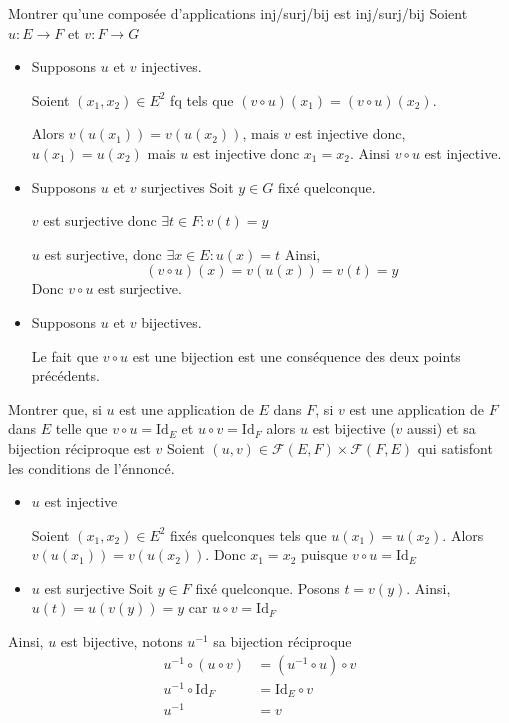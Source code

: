 \documentclass{article}
\renewenvironment{question_kholle}[2][ ]
{
	\subsection{\texorpdfstring{#2}{}}
	\notblank{#1}
	{
		\noindent #1
		\bigbreak
	}
	{}
	\begin{proof}
}
{
	\end{proof}
}
\begin{document}
\begin{question_kholle}{Montrer qu'une composée d'applications inj/surj/bij est inj/surj/bij}
	Soient $u : E \to F$ et $v: F \to G$
	\begin{itemize}[label = $\lozenge$]
		\item Supposons $u$ et $v$ injectives.

		      Soient $(x_{1}, x_{2}) \in E^{2}$ fq tels que $(v \circ u) (x_{1}) =(v\circ u)(x_{2})$.

		      Alors $v(u(x_{1})) = v(u(x_{2}))$, mais $v$ est injective donc, $u(x_{1})= u(x_{2})$ mais $u$ est injective donc $x_{1} = x_{2}$.
		      Ainsi $v \circ u$ est injective.
		\item Supposons $u$ et $v$ surjectives
		      Soit $y \in G$ fixé quelconque.

		      $v$ est surjective donc $\exists t \in F : v(t) = y$

		      $u$ est surjective, donc $\exists x \in E : u(x) = t$
		      Ainsi,
		      $$
			      (v \circ u) (x) = v(u(x)) = v(t) = y
		      $$
		      Donc $v \circ u$ est surjective.

		\item Supposons $u$ et $v$ bijectives.

		      Le fait que $v \circ u$ est une bijection est une conséquence des deux points précédents.

	\end{itemize}

\end{question_kholle}
\begin{question_kholle}{Montrer que, si $u$ est une application de $E$ dans $F$, si $v$ est une application de $F$ dans $E$ telle que $v \circ u = \mathrm{Id}_E$ et $u \circ v = \mathrm{Id}_F$ alors $u$ est bijective ($v$ aussi) et sa bijection réciproque est $v$}
	Soient $(u, v) \in \mathcal{F}(E, F) \times \mathcal{F}(F, E)$ qui satisfont les conditions de l'énnoncé.
	\begin{itemize}[label=$\lozenge$]
		\item $u$ est injective

		      Soient $(x_{1}, x_{2}) \in E^{2}$ fixés quelconques tels que $u(x_{1}) = u(x_{2})$. Alors $v(u(x_{1})) = v(u(x_{2}))$. Donc $x_{1} = x_{2}$ puisque $v \circ u = \mathrm{Id}_{E}$

		\item $u$ est surjective
		      Soit $y \in F$ fixé quelconque. Posons $t = v(y)$. Ainsi, $u(t) = u(v(y))= y$ car $u \circ v = \mathrm{Id}_{F}$


	\end{itemize}
	Ainsi, $u$ est bijective, notons $u^{-1}$ sa bijection réciproque
	\begin{align*}
		u^{-1} \circ (u \circ v )    & = (u^{-1} \circ u) \circ v \\
		u^{-1} \circ \mathrm{Id}_{F} & = \mathrm{Id}_{E}\circ v   \\
		u^{-1}                       & = v
	\end{align*}

\end{question_kholle}
\end{document}
